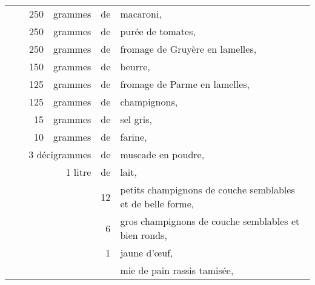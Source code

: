 \footnotesize
\begin{longtable}{rrrrrp{18em}}
  & \hspace{2em}  &  250 & grammes & de & macaroni,                                                       \\
  & \hspace{2em}  &  250 & grammes & de & purée de tomates,                                               \\
  & \hspace{2em}  &  250 & grammes & de & fromage de Gruyère en lamelles,                                 \\
  & \hspace{2em}  &  150 & grammes & de & beurre,                                                         \\
  & \hspace{2em}  &  125 & grammes & de & fromage de Parme en lamelles,                                   \\
  & \hspace{2em}  &  125 & grammes & de & champignons,                                                    \\
  & \hspace{2em}  &   15 & grammes & de & sel gris,                                                       \\
  & \hspace{2em}  &   10 & grammes & de & farine,                                                         \\
  & \multicolumn{3}{r}{3 décigrammes} & de & muscade en poudre,                                           \\
  & \hspace{2em}  &      & 1 litre & de & lait,                                                           \\
  & \hspace{2em}  &      &         & 12 & petits champignons de couche semblables et de belle forme,      \\
  & \hspace{2em}  &      &         &  6 & gros champignons de couche semblables et bien ronds,            \\
  & \hspace{2em}  &      &         &  1 & jaune d'œuf,                                                    \\
  & \hspace{2em}  &      &         &    & mie de pain rassis tamisée,                                     \\

\end{longtable}
